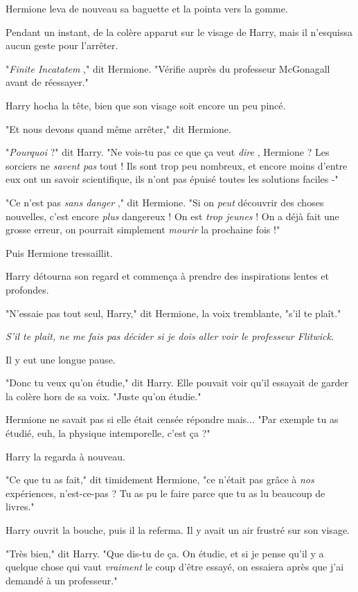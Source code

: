 Hermione leva de nouveau sa baguette et la pointa vers la gomme.

Pendant un instant, de la colère apparut sur le visage de Harry, mais il n'esquissa aucun geste pour l'arrêter.

"\emph{Finite Incatatem} ," dit Hermione. "Vérifie auprès du professeur McGonagall avant de réessayer."

Harry hocha la tête, bien que son visage soit encore un peu pincé.

"Et nous devons quand même arrêter," dit Hermione.

"\emph{Pourquoi}  ?" dit Harry. "Ne vois-tu pas ce que ça veut \emph{dire} , Hermione ? Les sorciers ne \emph{savent pas}  tout ! Ils sont trop peu nombreux, et encore moins d'entre eux ont un savoir scientifique, ils n'ont pas épuisé toutes les solutions faciles -"

"Ce n'est pas \emph{sans danger} ," dit Hermione. "Si on \emph{peut}  découvrir des choses nouvelles, c'est encore \emph{plus}  dangereux ! On est \emph{trop jeunes}  ! On a déjà fait une grosse erreur, on pourrait simplement \emph{mourir } la prochaine fois !"

Puis Hermione tressaillit.

Harry détourna son regard et commença à prendre des inspirations lentes et profondes.

"N'essaie pas tout seul, Harry," dit Hermione, la voix tremblante, "s'il te plaît."

\emph{S'il te plaît, ne me fais pas décider si je dois aller voir le professeur Flitwick.} 

Il y eut une longue pause.

"Donc tu veux qu'on étudie," dit Harry. Elle pouvait voir qu'il essayait de garder la colère hors de sa voix. "Juste qu'on étudie."

Hermione ne savait pas si elle était censée répondre mais... "Par exemple tu as étudié, euh, la physique intemporelle, c'est ça ?"

Harry la regarda à nouveau.

"Ce que tu as fait," dit timidement Hermione, "ce n'était pas grâce à \emph{nos } expériences, n'est-ce-pas ? Tu as pu le faire parce que tu as lu beaucoup de livres."

Harry ouvrit la bouche, puis il la referma. Il y avait un air frustré sur son visage.

"Très bien," dit Harry. "Que dis-tu de ça. On étudie, et si je pense qu'il y a quelque chose qui vaut \emph{vraiment } le coup d'être essayé, on essaiera après que j'ai demandé à un professeur."

